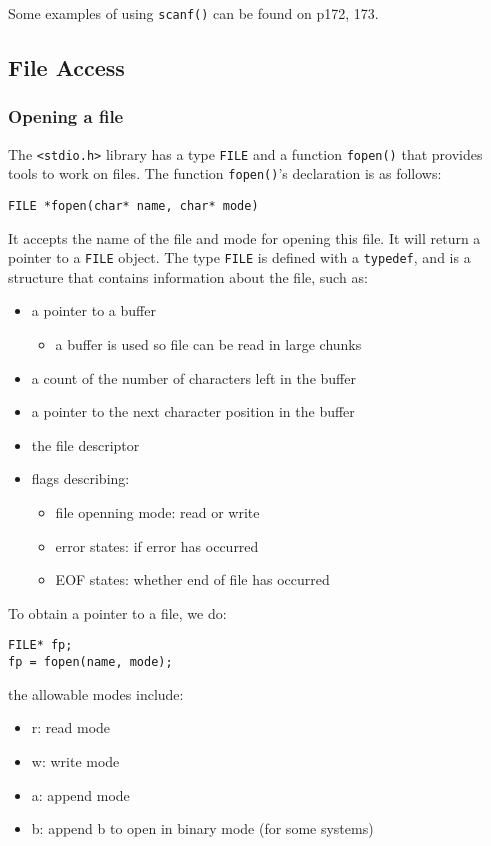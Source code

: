 \documentclass[11pt]{article}
\begin{document}
Some examples of using \texttt{scanf()} can be found on p172, 173.

\subsection{File Access\label{org3c3de33}}
\label{sec:orgf5a9c02}
\subsubsection{Opening a file}
\label{sec:org6643dc4}
The \texttt{<stdio.h>} library has a type \texttt{FILE} and a function \texttt{fopen()} that provides tools to work on files. The function \texttt{fopen()}'s declaration is as follows:
\begin{verbatim}
FILE *fopen(char* name, char* mode)
\end{verbatim}
It accepts the name of the file and mode for opening this file. It will return a pointer to a \texttt{FILE} object. The type \texttt{FILE} is defined with a \texttt{typedef}, and is a structure that contains information about the file, such as:
\begin{itemize}
\item a pointer to a buffer
\begin{itemize}
\item a buffer is used so file can be read in large chunks
\end{itemize}
\item a count of the number of characters left in the buffer
\item a pointer to the next character position in the buffer
\item the file descriptor
\item flags describing:
\begin{itemize}
\item file openning mode: read or write
\item error states: if error has occurred
\item EOF states: whether end of file has occurred
\end{itemize}
\end{itemize}

To obtain a pointer to a file, we do:
\begin{verbatim}
FILE* fp;
fp = fopen(name, mode);
\end{verbatim}
the allowable modes include:
\begin{itemize}
\item r: read mode
\item w: write mode
\item a: append mode
\item b: append b to open in binary mode (for some systems)
\end{itemize}
\end{document}
